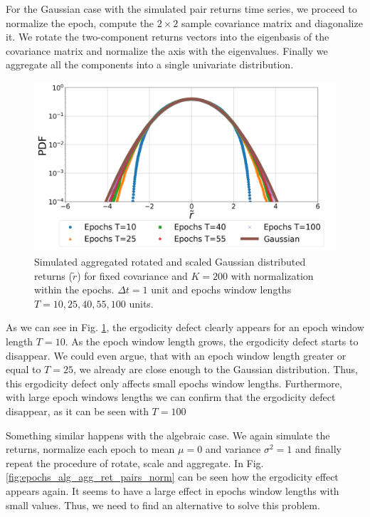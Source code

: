For the Gaussian case with the simulated pair returns time series, we proceed
to normalize the epoch, compute the $2 \times 2$ sample covariance matrix and
diagonalize it. We rotate the two-component returns vectors into the eigenbasis
of the covariance matrix and normalize the axis with the eigenvalues. Finally
we aggregate all the components into a single univariate distribution.

\begin{figure}[htbp]
    \centering
    \includegraphics[width=0.6\columnwidth]
    {figures/06_epochs_sim_gauss_agg_ret_pairs_norm.png}
    \caption{Simulated aggregated rotated and scaled Gaussian distributed
             returns ($\tilde{r}$) for fixed covariance and $K=200$ with
             normalization within the epochs. $\Delta t = 1$ unit and epochs
             window lengths $T=10, 25, 40, 55, 100$ units.}
    \label{fig:epochs_gauss_agg_ret_pairs_norm}
\end{figure}

As we can see in Fig. \ref{fig:epochs_gauss_agg_ret_pairs_norm}, the ergodicity
defect clearly appears for an epoch window length $T = 10$. As the epoch window
length grows, the ergodicity defect starts to disappear. We could even argue,
that with an epoch window length greater or equal to $T = 25$, we already are
close enough to the Gaussian distribution. Thus, this ergodicity defect only
affects small epochs window lengths. Furthermore, with large epoch windows
lengths we can confirm that the ergodicity defect disappear, as it can be seen
 with $T = 100$

Something similar happens with the algebraic case. We again simulate the
returns, normalize each epoch to mean $\mu = 0$ and variance $\sigma^{2} = 1$
and finally repeat the procedure of rotate, scale and aggregate. In Fig.
\ref{fig:epochs_alg_agg_ret_pairs_norm} can be seen how the ergodicity effect
appears again. It seems to have a large effect in epochs window lengths with
small values. Thus, we need to find an alternative to solve this problem.

